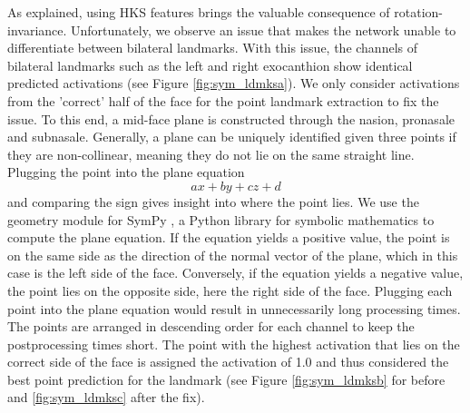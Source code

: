 \documentclass[class=article, crop=false]{standalone}
\begin{document}
As explained, using HKS features brings the valuable consequence of rotation-invariance. Unfortunately, we observe an issue that makes the network unable to differentiate between bilateral landmarks. With this issue, the channels of bilateral landmarks such as the left and right exocanthion show identical predicted activations (see Figure \ref{fig:sym_ldmksa}). We only consider activations from the 'correct' half of the face for the point landmark extraction to fix the issue. To this end, a mid-face plane is constructed through the nasion, pronasale and subnasale. Generally, a plane can be uniquely identified given three points if they are non-collinear, meaning they do not lie on the same straight line. Plugging the point into the plane equation
\begin{equation}
    ax + by + cz + d 
\end{equation} 
and comparing the sign gives insight into where the point lies. We use the geometry module for SymPy \cite{10.7717/peerj-cs.103}, a Python library for symbolic mathematics to compute the plane equation. If the equation yields a positive value, the point is on the same side as the direction of the normal vector of the plane, which in this case is the left side of the face. Conversely, if the equation yields a negative value, the point lies on the opposite side, here the right side of the face. Plugging each point into the plane equation would result in unnecessarily long processing times. The points are arranged in descending order for each channel to keep the postprocessing times short. The point with the highest activation that lies on the correct side of the face is assigned the activation of 1.0 and thus considered the best point prediction for the landmark (see Figure \ref{fig:sym_ldmksb} for before and \ref{fig:sym_ldmksc} after the fix).
\end{document}
